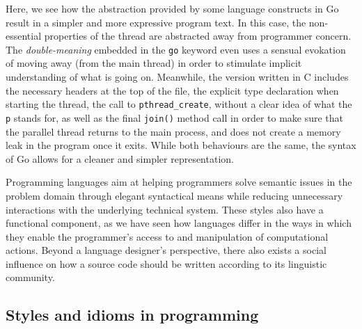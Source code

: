 Here, we see how the abstraction provided by some language constructs in Go result in a simpler and more expressive program text. In this case, the non-essential properties of the thread are abstracted away from programmer concern. The \emph{double-meaning} embedded in the \lstinline{go} keyword even uses a sensual evokation of moving away (from the main thread) in order to stimulate implicit understanding of what is going on. Meanwhile, the version written in C includes the necessary headers at the top of the file, the explicit type declaration when starting the thread, the call to \lstinline{pthread_create}, without a clear idea of what the \lstinline{p} stands for,  as well as the final \lstinline{join()} method call in order to make sure that the parallel thread returns to the main process, and does not create a memory leak in the program once it exits. While both behaviours are the same, the syntax of Go allows for a cleaner and simpler representation.

Programming languages aim at helping programmers solve semantic issues in the problem domain through elegant syntactical means while reducing unnecessary interactions with the underlying technical system. These styles also have a functional component, as we have seen how languages differ in the ways in which they enable the programmer's access to and manipulation of computational actions. Beyond a language designer's perspective, there also exists a social influence on how a source code should be written according to its linguistic community.

\subsection{Styles and idioms in programming}
\label{subsec:style-idioms-programming}


